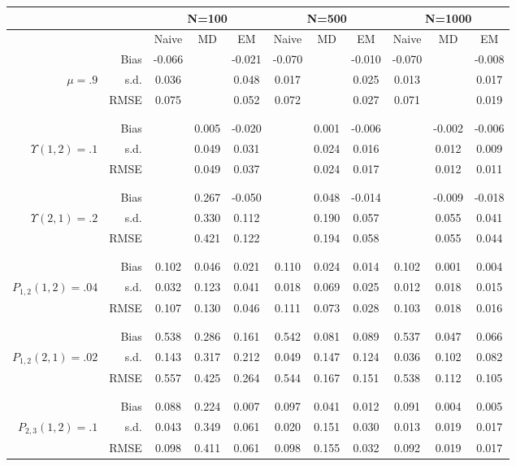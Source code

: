 \begin{tabular}{rr@{\hskip .3in}ccc@{\hskip .4in}ccc@{\hskip .4in}ccc}
\hline
& &  \multicolumn{3}{c}{N=100}&\multicolumn{3}{c}{N=500}&\multicolumn{3}{c}{N=1000} \\
\hline
&   &Naive & MD & EM &Naive & MD & EM &Naive & MD & EM \\
\hline
&Bias & -0.066&&-0.021&-0.070&&-0.010&-0.070&&-0.008 \\
$ \mu=.9 $& s.d. & 0.036&&0.048&0.017&&0.025&0.013&&0.017 \\
&RMSE & 0.075&&0.052&0.072&&0.027&0.071&&0.019 \\
\\\\&Bias & &0.005&-0.020&&0.001&-0.006&&-0.002&-0.006 \\
$ \Upsilon(1,2)=.1 $& s.d. & &0.049&0.031&&0.024&0.016&&0.012&0.009 \\
&RMSE & &0.049&0.037&&0.024&0.017&&0.012&0.011 \\
\\\\&Bias & &0.267&-0.050&&0.048&-0.014&&-0.009&-0.018 \\
$ \Upsilon(2,1)=.2 $& s.d. & &0.330&0.112&&0.190&0.057&&0.055&0.041 \\
&RMSE & &0.421&0.122&&0.194&0.058&&0.055&0.044 \\
\\\\&Bias & 0.102&0.046&0.021&0.110&0.024&0.014&0.102&0.001&0.004 \\
$ P_{1,2}(1,2)=.04 $& s.d. & 0.032&0.123&0.041&0.018&0.069&0.025&0.012&0.018&0.015 \\
&RMSE & 0.107&0.130&0.046&0.111&0.073&0.028&0.103&0.018&0.016 \\
\\\\&Bias & 0.538&0.286&0.161&0.542&0.081&0.089&0.537&0.047&0.066 \\
$ P_{1,2}(2,1)=.02 $& s.d. & 0.143&0.317&0.212&0.049&0.147&0.124&0.036&0.102&0.082 \\
&RMSE & 0.557&0.425&0.264&0.544&0.167&0.151&0.538&0.112&0.105 \\
\\\\&Bias & 0.088&0.224&0.007&0.097&0.041&0.012&0.091&0.004&0.005 \\
$ P_{2,3}(1,2)=.1 $& s.d. & 0.043&0.349&0.061&0.020&0.151&0.030&0.013&0.019&0.017 \\
&RMSE & 0.098&0.411&0.061&0.098&0.155&0.032&0.092&0.019&0.017 \\

\end{tabular}
